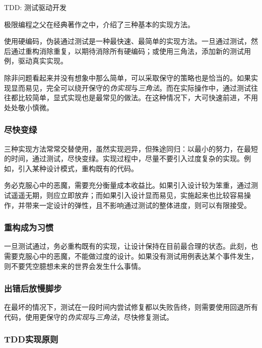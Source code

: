 \begin{content}
\begin{episode}{TDD: 测试驱动开发}
\begin{content}
极限编程之父在经典著作之中，介绍了三种基本的实现方法。

\begin{enum}
\end{enum}

使用硬编码，伪装通过测试是一种最快速、最简单的实现方法。一旦通过测试，然后通过重构消除重复，以期待消除所有硬编码；或使用三角法，添加新的测试用例，驱动真实实现。

除非问题看起来并没有想象中那么简单，可以采取保守的策略也是恰当的。如果实现显而易见，完全可以绕开保守的\emph{伪实现}与\emph{三角法}。而在实际操作中，通过测试往往都比较简单，显式实现也是最常见的做法。在这种情况下，大可快速前进，不用处处敬小慎微。

\subsubsection{尽快变绿}

三种实现方法常常交替使用，虽然实现迥异，但殊途同归：以最小的努力，在最短的时间，通过测试，尽快变绿。实现过程中，尽量不要引入过度复杂的实现。例如，引入某种设计模式，重构既有的代码。

务必克服心中的恶魔，需要充分衡量成本收益比。如果引入设计较为笨重，通过测试遥遥无期，则应立即放弃；而如果引入设计显而易见，实施起来也比较容易操作，并带来一定设计的弹性，且不影响通过测试的整体进度，则可以有限接受。

\subsubsection{重构成为习惯}

一旦测试通过，务必重构既有的实现，让设计保持在目前最合理的状态。此刻，也需要克服心中的恶魔，不能做过度的设计。如果没有测试用例表达某个事件发生，则不要凭空臆想未来的世界会发生什么事情。

\subsubsection{出错后放慢脚步}

在最坏的情况下，测试在一段时间内尝试修复都以失败告终，则需要使用回退所有代码，使用更保守的\emph{伪实现}与\emph{三角法}，尽快修复测试。

\subsubsection{TDD实现原则}


\end{content}
\end{episode}
\end{content}
